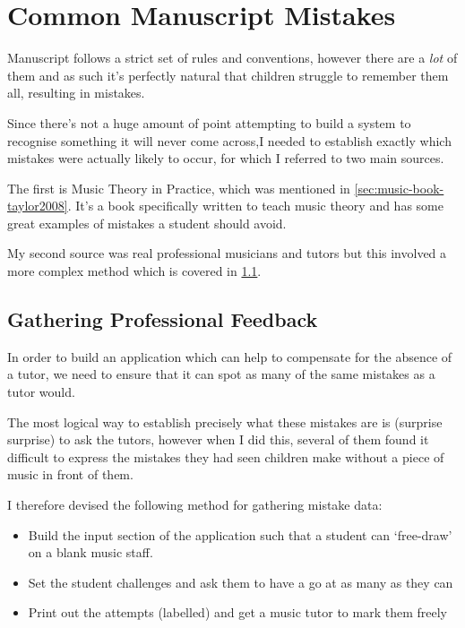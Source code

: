 \section{Common Manuscript Mistakes}

Manuscript follows a strict set of rules and conventions, however there are a \emph{lot} of them and as such it's perfectly natural that children struggle to remember them all, resulting in mistakes.

Since there's not a huge amount of point attempting to build a system to recognise something it will never come across,I needed to establish exactly which mistakes were actually likely to occur, for which I referred to two main sources.

The first is Music Theory in Practice, \parencite{taylor2008music} which was mentioned in \cref{sec:music-book-taylor2008}. It's a book specifically written to teach music theory and has some great examples of mistakes a student should avoid.

My second source was real professional musicians and tutors but this involved a more complex method which is covered in \cref{sec:teacher-data-gathering}.

\subsection{Gathering Professional Feedback}
\label{sec:teacher-data-gathering}

In order to build an application which can help to compensate for the absence of a tutor, we need to ensure that it can spot as many of the same mistakes as a tutor would.

The most logical way to establish precisely what these mistakes are is (surprise surprise) to ask the tutors, however when I did this, several of them found it difficult to express the mistakes they had seen children make without a piece of music in front of them.

I therefore devised the following method for gathering mistake data:

\begin{itemize}
  \item Build the input section of the application such that a student can `free-draw' on a blank music staff.
  \item Set the student challenges and ask them to have a go at as many as they can
  \item Print out the attempts (labelled) and get a music tutor to mark them freely
\end{itemize}

